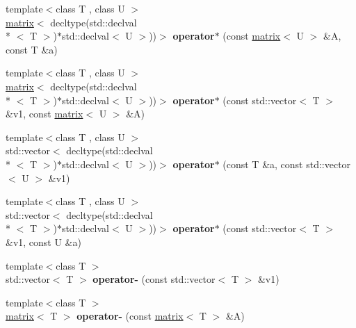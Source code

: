 \begin{DoxyCompactItemize}
\item 
\hypertarget{namespacekeycpp_ae187563f8f86e256bc1394edcba1b2b1}{{\footnotesize template$<$class T , class U $>$ }\\\hyperlink{classkeycpp_1_1matrix}{matrix}$<$ decltype(std\-::declval\\*
$<$ T $>$)$\ast$std\-::declval$<$ U $>$))$>$ {\bfseries operator$\ast$} (const \hyperlink{classkeycpp_1_1matrix}{matrix}$<$ U $>$ \&A, const T \&a)}\label{namespacekeycpp_ae187563f8f86e256bc1394edcba1b2b1}

\item 
\hypertarget{namespacekeycpp_a6dcf10b0db68d53d126803e8d6d591fb}{{\footnotesize template$<$class T , class U $>$ }\\\hyperlink{classkeycpp_1_1matrix}{matrix}$<$ decltype(std\-::declval\\*
$<$ T $>$)$\ast$std\-::declval$<$ U $>$))$>$ {\bfseries operator$\ast$} (const std\-::vector$<$ T $>$ \&v1, const \hyperlink{classkeycpp_1_1matrix}{matrix}$<$ U $>$ \&A)}\label{namespacekeycpp_a6dcf10b0db68d53d126803e8d6d591fb}

\item 
\hypertarget{namespacekeycpp_a4b523ff3dd5abac240788f6efb2e554e}{{\footnotesize template$<$class T , class U $>$ }\\std\-::vector$<$ decltype(std\-::declval\\*
$<$ T $>$)$\ast$std\-::declval$<$ U $>$))$>$ {\bfseries operator$\ast$} (const T \&a, const std\-::vector$<$ U $>$ \&v1)}\label{namespacekeycpp_a4b523ff3dd5abac240788f6efb2e554e}

\item 
\hypertarget{namespacekeycpp_aa2e9a06b12f7df18005a3daa3c051b2c}{{\footnotesize template$<$class T , class U $>$ }\\std\-::vector$<$ decltype(std\-::declval\\*
$<$ T $>$)$\ast$std\-::declval$<$ U $>$))$>$ {\bfseries operator$\ast$} (const std\-::vector$<$ T $>$ \&v1, const U \&a)}\label{namespacekeycpp_aa2e9a06b12f7df18005a3daa3c051b2c}

\item 
\hypertarget{namespacekeycpp_ac2665554c04ea23aad98e77d1618ca6b}{{\footnotesize template$<$class T $>$ }\\std\-::vector$<$ T $>$ {\bfseries operator-\/} (const std\-::vector$<$ T $>$ \&v1)}\label{namespacekeycpp_ac2665554c04ea23aad98e77d1618ca6b}

\item 
\hypertarget{namespacekeycpp_a390125160a7febd08d5c30629f4f698f}{{\footnotesize template$<$class T $>$ }\\\hyperlink{classkeycpp_1_1matrix}{matrix}$<$ T $>$ {\bfseries operator-\/} (const \hyperlink{classkeycpp_1_1matrix}{matrix}$<$ T $>$ \&A)}\label{namespacekeycpp_a390125160a7febd08d5c30629f4f698f}


\end{DoxyCompactItemize}
